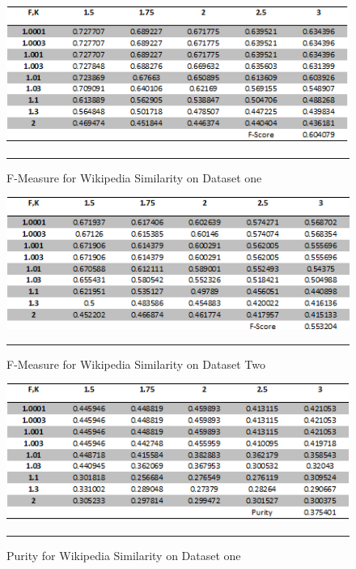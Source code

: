 \begin{figure}[htbp]
	\centering
		\includegraphics{./Figures/wiki_F_DS1.png}
		\rule{35em}{0.5pt}
	\caption[F-Measure for Wikipedia Similarity on Dataset one]{F-Measure for Wikipedia Similarity on Dataset one}
	\label{fig:F5}
\end{figure}

\begin{figure}[htbp]
	\centering
		\includegraphics{./Figures/wiki_F_DS2.png}
		\rule{35em}{0.5pt}
	\caption[F-Measure for Wikipedia Similarity on Dataset Two]{F-Measure for Wikipedia Similarity on Dataset Two}
	\label{fig:F6}
\end{figure}

\begin{figure}[htbp]
	\centering
		\includegraphics{./Figures/wiki_Purity_DS1.png}
		\rule{35em}{0.5pt}
	\caption[Purity for Wikipedia Similarity on Dataset one]{Purity for Wikipedia Similarity on Dataset one}
	\label{fig:F7}
\end{figure}

